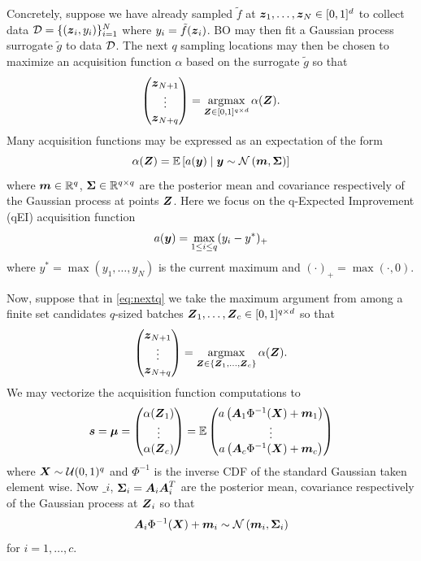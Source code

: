 \documentclass{article}[12pt]
\begin{document}
Concretely, suppose we have already sampled $\tilde{f}$ at $\boldsymbol{z}_1,\dots,\boldsymbol{z}_{N} \in [0,1]^{d}$ to collect data $\mathcal{D}=\{(\boldsymbol{z}_i,y_i)\}_{i=1}^N$ where $y_i = \tilde{f}(\boldsymbol{z}_i)$. BO may then fit a Gaussian process surrogate $\tilde{g}$ to data $\mathcal{D}$. The next $q$ sampling locations may then be chosen to maximize  an acquisition function $\alpha$ based on the surrogate $\tilde{g}$ so that 
\begin{equation}
    \begin{pmatrix}\boldsymbol{z}_{N+1} \\ \vdots \\ \boldsymbol{z}_{N+q}\end{pmatrix} = \operatorname*{argmax}_{\boldsymbol{Z} \in [0,1]^{q \times d}}\alpha(\boldsymbol{Z}).
    \label{eq:nextq}
\end{equation}
Many acquisition functions may be expressed as an expectation of the form
$$\alpha(\boldsymbol{Z}) = \mathbb{E}\left[a(\boldsymbol{y}) \mid \boldsymbol{y} \sim \mathcal{N}\left(\boldsymbol{m},\boldsymbol{\Sigma}\right)\right]$$
where $\boldsymbol{m} \in \mathbb{R}^{q}$, $\boldsymbol{\Sigma} \in \mathbb{R}^{q \times q}$ are the posterior mean and covariance respectively of the Gaussian process at points $\boldsymbol{Z}$. Here we focus on the q-Expected Improvement (qEI) acquisition function
$$a(\boldsymbol{y}) = \max_{1 \leq i \leq q} (y_i - y^*)_+$$
where $y^*= \max\left(y_1,\dots,y_N\right)$ is the current maximum and $(\cdot)_+ = \max(\cdot,0)$. 

Now, suppose that in \eqref{eq:nextq} we take the maximum argument from among a finite set candidates $q$-sized batches $\boldsymbol{Z}_1,\dots,\boldsymbol{Z}_c \in [0,1]^{q \times d}$ so that 
\begin{equation}
    \begin{pmatrix}\boldsymbol{z}_{N+1} \\ \vdots \\ \boldsymbol{z}_{N+q}\end{pmatrix} = \operatorname*{argmax}_{\boldsymbol{Z} \in \{\boldsymbol{Z}_1,\dots,\boldsymbol{Z}_c\}}\alpha(\boldsymbol{Z}).
    \label{eq:nextq_discrete}
\end{equation}
We may vectorize the acquisition function computations to 
\begin{equation}
    \boldsymbol{s} = \boldsymbol{\mu} = \begin{pmatrix} \alpha(\boldsymbol{Z}_1) \\ \vdots \\ \alpha(\boldsymbol{Z}_c)\end{pmatrix} = \mathbb{E}\begin{pmatrix}a\left(\boldsymbol{A}_1\Phi^{-1}(\boldsymbol{X})+\boldsymbol{m}_1\right) \\ \vdots \\ a\left(\boldsymbol{A}_c\Phi^{-1}(\boldsymbol{X})+\boldsymbol{m}_c\right)\end{pmatrix}
    \label{eq:bs_qei}
\end{equation}
where $\boldsymbol{X} \sim \mathcal{U}(0,1)^q$ and $\Phi^{-1}$ is the inverse CDF of the standard Gaussian taken element wise. Now $\bm_i$, $\boldsymbol{\Sigma}_i = \boldsymbol{A}_i\boldsymbol{A}_i^T$ are the posterior mean, covariance respectively of the Gaussian process at $\boldsymbol{Z}_i$ so that 
$$\boldsymbol{A}_i\Phi^{-1}(\boldsymbol{X})+\boldsymbol{m}_i \sim \mathcal{N}\left(\boldsymbol{m}_i,\boldsymbol{\Sigma}_i\right)$$
for $i=1,\dots,c$.
\end{document}
